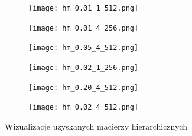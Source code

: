 \documentclass{../myclass}
\begin{document}
\begin{figure}
    \centering
    \begin{subfigure}[b]{0.45\textwidth}
        \centering
        \texttt{[image: hm\_0.01\_1\_512.png]}
    \end{subfigure}
    \hfill
    \begin{subfigure}[b]{0.45\textwidth}
        \centering
        \texttt{[image: hm\_0.01\_4\_256.png]}
    \end{subfigure}
    \vfill
    \centering
    \begin{subfigure}[b]{0.45\textwidth}
        \centering
        \texttt{[image: hm\_0.05\_4\_512.png]}
    \end{subfigure}
    \hfill
    \begin{subfigure}[b]{0.45\textwidth}
        \centering
        \texttt{[image: hm\_0.02\_1\_256.png]}
    \end{subfigure}
    \vfill
    \centering
    \begin{subfigure}[b]{0.45\textwidth}
        \centering
        \texttt{[image: hm\_0.20\_4\_512.png]}
    \end{subfigure}
    \hfill
    \begin{subfigure}[b]{0.45\textwidth}
        \centering
        \texttt{[image: hm\_0.02\_4\_512.png]}
    \end{subfigure}
    \caption{Wizualizacje uzyskanych macierzy hierarchicznych}
    \label{Fig:1}
\end{figure}
\end{document}
